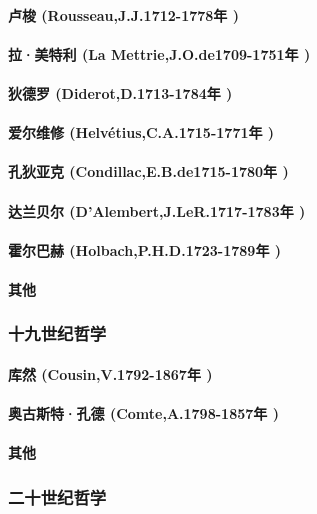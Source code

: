 \documentclass[UTF8]{../RepresentationUniverse}
\begin{document}
    \paragraph{卢梭 (Rousseau,J.J.1712-1778年 )}
    \paragraph{拉·美特利 (La Mettrie,J.O.de1709-1751年 )}
    \paragraph{狄德罗 (Diderot,D.1713-1784年 )}
    \paragraph{爱尔维修 (Helvétius,C.A.1715-1771年 )}
    \paragraph{孔狄亚克 (Condillac,E.B.de1715-1780年 )}
    \paragraph{达兰贝尔 (D'Alembert,J.LeR.1717-1783年 )}
    \paragraph{霍尔巴赫 (Holbach,P.H.D.1723-1789年 )}
    \paragraph{其他}

\subsubsection{十九世纪哲学}
    \paragraph{库然 (Cousin,V.1792-1867年 )}
    \paragraph{奥古斯特·孔德 (Comte,A.1798-1857年 )}
    \paragraph{其他}
\subsubsection{二十世纪哲学}
\end{document}
